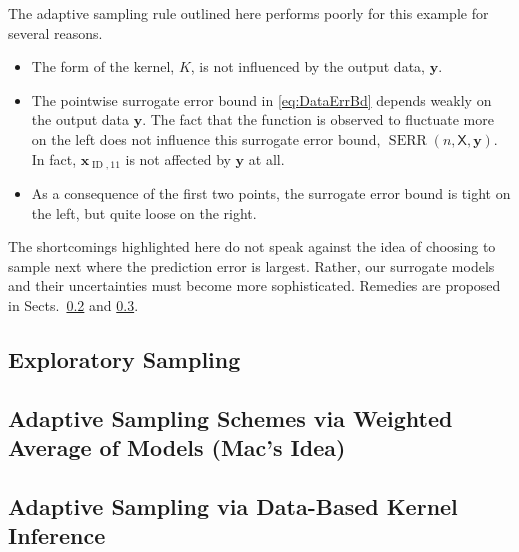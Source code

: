 \documentclass[11pt]{NSFamsart}
\DeclareMathOperator{\ID}{ID}
\DeclareMathOperator{\SURRERR}{SERR}
\newcommand{\mX}{\mathsf{X}}
\newcommand{\bx}{{\boldsymbol{x}}}
\newcommand{\by}{{\boldsymbol{y}}}
\begin{document}
The adaptive sampling rule outlined here performs poorly for this example for several reasons.
\begin{itemize}
    \item The form of the kernel, $K$, is not influenced by the output data, $\by$.
    
    \item The pointwise surrogate error bound in \eqref{eq:DataErrBd} depends weakly on the output data $\by$.  The fact that the function is observed to fluctuate more on the left does not influence this surrogate error bound, $\SURRERR(n,\mX,\by)$.  In fact, $\bx_{\ID,11}$ is not affected by $\by$ at all.
    
    \item As a consequence of the first two points, the surrogate error bound is tight on the left, but quite loose on the right. 
\end{itemize}
The shortcomings highlighted here do not speak against the idea of choosing to sample next where the prediction error is largest.  Rather, our surrogate models and their uncertainties must become more sophisticated.  Remedies are proposed in Sects.\ \ref{sec:Bootstrap} and \ref{sec:kerinferdata}.





\subsection{Exploratory Sampling} \label{sec:exploreSample}


\subsection{Adaptive Sampling Schemes via Weighted Average of Models (Mac's Idea)} \label{sec:Bootstrap}



\subsection{Adaptive Sampling via Data-Based Kernel Inference} \label{sec:kerinferdata}
\end{document}
